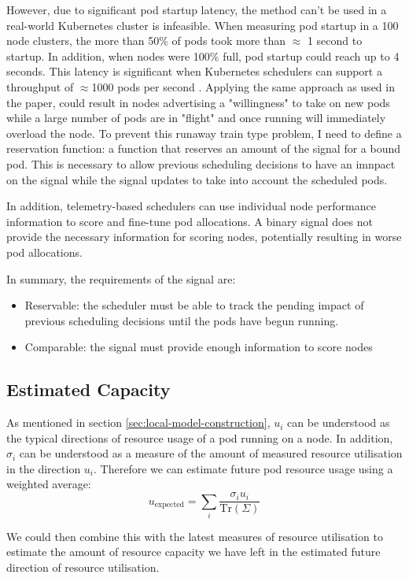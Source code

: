 However, due to significant pod startup latency, the method can't be used in a
real-world Kubernetes cluster is infeasible. When measuring pod startup in a
100 node clusters, the more than 50\% of pods took more than $\approx$ 1 second
to startup. In addition, when nodes were 100\% full, pod startup could reach up
to 4 seconds. This latency is significant when Kubernetes schedulers can
support a throughput of $\approx$1000 pods per second
\cite{qadeer_scaling_2022}. Applying the same approach as used in the paper,
could result in nodes advertising a "willingness" to take on new pods while
a large number of pods are in "flight" and once running will immediately
overload the node. To prevent this runaway train type problem, I need to define
a reservation function: a function that reserves an amount of the signal for a
bound pod. This is necessary to allow previous scheduling decisions to have an
imnpact on the signal while the signal updates to take into account the
scheduled pods.

In addition, telemetry-based schedulers can use individual node performance
information to score and fine-tune pod allocations. A binary signal does not
provide the necessary information for scoring nodes, potentially resulting in
worse pod allocations.

In summary, the requirements of the signal are:
\begin{itemize}
    \item Reservable: the scheduler must be able to track the pending impact of
        previous scheduling decisions until the pods have begun running.
    \item Comparable: the signal must provide enough information to score nodes
\end{itemize}

\subsection{Estimated Capacity}
As mentioned in section \ref{sec:local-model-construction}, $u_i$ can be
understood as the typical directions of resource usage of a pod running on a
node. In addition, $\sigma_i$ can be understood as a measure of the amount of
measured resource utilisation in the direction $u_i$. Therefore we can
estimate future pod resource usage using a weighted average:
\[ u_\text{expected} = \sum_i \frac{\sigma_i u_i}{\text{Tr}(\Sigma)} \]

We could then combine this with the latest measures of resource utilisation to
estimate the amount of resource capacity we have left in the estimated future
direction of resource utilisation.

